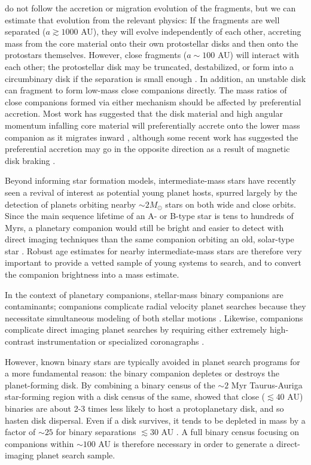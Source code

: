 \documentclass{utthesis}
\begin{document}
\citet{Machida2008} do not follow the accretion or migration evolution of the fragments, but we can estimate that evolution from the relevant physics: If the fragments are well separated ($a \gtrsim 1000$ AU), they will evolve independently of each other, accreting mass from the core material onto their own protostellar disks and then onto the protostars themselves.  However, close fragments ($a \sim 100$ AU) will interact with each other; the protostellar disk may be truncated, destabilized, or form into a circumbinary disk if the separation is small enough \citep{Bate1997}. In addition, an unstable disk can fragment to form low-mass close companions \citep{Kratter2006, Stamatellos2011} directly. The mass ratios of close companions formed via either mechanism should be affected by preferential accretion. Most work has suggested that the disk material and high angular momentum infalling core material will preferentially accrete onto the lower mass companion as it migrates inward \citep{Bate1997, BBB2002}, although some recent work has suggested the preferential accretion may go in the opposite direction as a result of magnetic disk braking \citep{Zhao2013}.

Beyond informing star formation models, intermediate-mass stars have recently seen a revival of interest as potential young planet hosts, spurred largely by the detection of planets orbiting nearby \mbox{$\sim2 M_{\odot}$} stars on both wide \citep[e.g.][]{Lagrange2010, Marois2008} and close \citep{Johnson2011} orbits. Since the main sequence lifetime of an A- or B-type star is tens to hundreds of Myrs, a planetary companion would still be bright and easier to detect with direct imaging techniques than the same companion orbiting an old, solar-type star \citep{Marley2007}. Robust age estimates for nearby intermediate-mass stars are therefore very important to provide a vetted sample of young systems to search, and to convert the companion brightness into a mass estimate. 

In the context of planetary companions, stellar-mass binary companions are contaminants; companions complicate radial velocity planet searches because they necessitate simultaneous modeling of both stellar motions \citep[e.g.][]{Bergmann2015}. Likewise, companions complicate direct imaging planet searches by requiring either extremely high-contrast instrumentation \citep{Thalmann2014} or specialized coronagraphs \citep{Crepp2010}. 

However, known binary stars are typically avoided in planet search programs for a more fundamental reason: the binary companion depletes or destroys the planet-forming disk. By combining a binary census of the $\sim 2$ Myr Taurus-Auriga star-forming region with a disk census of the same, \cite{Kraus2012} showed that close ($\lesssim 40$ AU) binaries are about 2-3 times less likely to host a protoplanetary disk, and so hasten disk dispersal. Even if a disk survives, it tends to be depleted in mass by a factor of $\sim 25$ for binary separations $\lesssim 30$ AU \citep{Harris2012}. A full binary census focusing on companions within $\sim 100$ AU is therefore necessary in order to generate a direct-imaging planet search sample.
\end{document}
